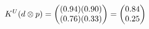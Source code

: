 \documentclass[preview]{standalone}
\begin{document}
\begin{align*}
\special{dvisvgm:raw <g id='unique000'>}K^U(d \otimes p) = \begin{pmatrix} (0.94)(0.90) \\ (0.76)(0.33) \end{pmatrix} = \begin{pmatrix} 0.84 \\ 0.25 \end{pmatrix}\special{dvisvgm:raw </g>}
\end{align*}
\end{document}
